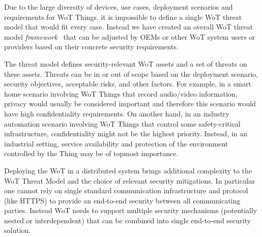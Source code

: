 
Due to the large diversity of devices,
use cases,
deployment scenarios 
and requirements for WoT Things,
it is impossible to define a single WoT threat model
that would fit every case.
Instead we have created an overall WoT threat model
\emph{framework}~\cite{Wot2017sec} 
that can be adjusted by OEMs or other WoT system users or providers
based on their concrete security requirements.


The threat model defines security-relevant WoT assets 
and a set of threats on these assets.
Threats can be in or out of scope based on the deployment scenario,
security objectives, acceptable risks, and other factors.
For example,
in a smart home scenario involving WoT Things that record audio/video
information, privacy would usually be considered important and 
therefore this scenario would have high confidentiality requirements.
On another hand,
in an industry automation scenario involving WoT Things that 
control some safety-critical infrastructure,
confidentiality might not be the highest priority.
Instead, in an industrial setting, service availability
and protection of the environment controlled by the Thing 
may be of topmost importance.

Deploying the WoT in a distributed system brings additional complexity 
to the WoT Threat Model and the choice of relevant security mitigations.
In particular one cannot rely on single standard communication infrastructure 
and protocol 
(like HTTPS) to provide an end-to-end security between all communicating
parties.
Instead WoT needs to support multiple security mechanisms 
(potentially nested or interdependent) 
that can be combined into single end-to-end security solution.  
 
